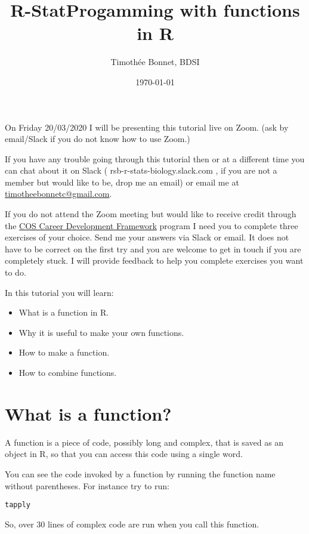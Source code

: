 \documentclass[12pt,a4paper]{scrartcl}\usepackage[]{graphicx}\usepackage[]{color}
\title{R-StatProgamming with functions in R}
\date{\today}
\author{Timoth\'ee Bonnet, BDSI}
\makeatletter
\newcommand{\hlstd}[1]{\textcolor[rgb]{0.345,0.345,0.345}{#1}}%
\newenvironment{kframe}{%
 \def\at@end@of@kframe{}%
 \ifinner\ifhmode%
  \def\at@end@of@kframe{\end{minipage}}%
  \begin{minipage}{\columnwidth}%
 \fi\fi%
 \def\FrameCommand##1{\hskip\@totalleftmargin \hskip-\fboxsep
 \colorbox{shadecolor}{##1}\hskip-\fboxsep
     \hskip-\linewidth \hskip-\@totalleftmargin \hskip\columnwidth}%
 \MakeFramed {\advance\hsize-\width
   \@totalleftmargin\z@ \linewidth\hsize
   \@setminipage}}%
 {\par\unskip\endMakeFramed%
 \at@end@of@kframe}
\newenvironment{knitrout}{}{} %
\makeatother
\begin{document}
\maketitle

On Friday 20/03/2020 I will be presenting this tutorial live on Zoom. (ask by email/Slack if you do not know how to use Zoom.)

If you have any trouble going through this tutorial then or at a different time you can chat about it on Slack ( rsb-r-stats-biology.slack.com , if you are not a member but would like to be, drop me an email) or email me at \href{mailto:timotheebonnetc@gmail.com}{timotheebonnetc@gmail.com}.

If you do not attend the Zoom meeting but would like to receive credit through the \href{https://wattlecourses.anu.edu.au/enrol/index.php?id=23938}{COS Career Development Framework} program I need you to complete three exercises of your choice. Send me your answers via Slack or email. It does not have to be correct on the first try and you are welcome to get in touch if you are completely stuck. I will provide feedback to help you complete exercises you want to do.

In this tutorial you will learn:

\begin{itemize}
    \item What is a function in R.
    \item Why it is useful to make your own functions.
    \item How to make a function.
    \item How to combine functions.
\end{itemize}

\tableofcontents
\ListOfExerciseInToc
{}

\clearpage



\section{What is a function?}

A function is a piece of code, possibly long and complex, that is saved as an object in R, so that you can access this code using a single word.

You can see the code invoked by a function by running the function name without parentheses. For instance try to run:
\begin{knitrout}
\color{fgcolor}\begin{kframe}
\begin{alltt}
\hlstd{tapply}
\end{alltt}
\end{kframe}
\end{knitrout}
So, over 30 lines of complex code are run when you call this function.
\end{document}
